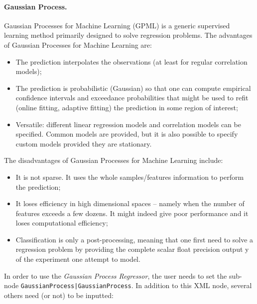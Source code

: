 \paragraph{Gaussian Process.}
\label{GP}
Gaussian Processes for Machine Learning (GPML) is a generic supervised learning
method primarily designed to solve regression problems.
%
The advantages of Gaussian Processes for Machine Learning are:
\begin{itemize}
  \item The prediction interpolates the observations (at least for regular
  correlation models);
  \item The prediction is probabilistic (Gaussian) so that one can compute
  empirical confidence intervals and exceedance probabilities that might be used
  to refit (online fitting, adaptive fitting) the prediction in some region of
  interest;
  \item Versatile: different linear regression models and correlation models can
  be specified.
  Common models are provided, but it is also possible to specify custom models
  provided they are stationary.
\end{itemize}
The disadvantages of Gaussian Processes for Machine Learning include:
\begin{itemize}
  \item It is not sparse.
  It uses the whole samples/features information to perform the prediction;
  \item It loses efficiency in high dimensional spaces – namely when the
  number of features exceeds a few dozens.
  It might indeed give poor performance and it loses computational efficiency;
  \item Classification is only a post-processing, meaning that one first need to
  solve a regression problem by providing the complete scalar float precision
  output y of the experiment one attempt to model.
\end{itemize}
In order to use the \textit{Gaussian Process Regressor}, the user needs to set
the sub-node \texttt{GaussianProcess|GaussianProcess}.
%
In addition to this XML node, several others need (or not) to be inputted:
